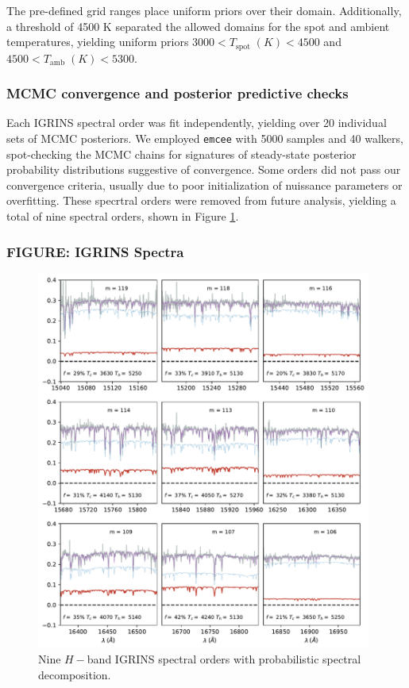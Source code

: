 \documentclass[twocolumn]{emulateapj}%
\begin{document}
\begin{itemize}
The pre-defined grid ranges place uniform priors over their domain.  Additionally, a threshold of 4500 K separated the allowed domains for the spot and ambient temperatures, yielding uniform priors $3000 < T_{\mathrm{spot}} \; (K) < 4500 $ and $4500 < T_{\mathrm{amb}} \; (K) < 5300$.

\subsubsection{MCMC convergence and posterior predictive checks}
Each IGRINS spectral order was fit independently, yielding over 20 individual sets of MCMC posteriors.  We employed \texttt{emcee} \citep{foreman13} with 5000 samples and 40 walkers, spot-checking the MCMC chains for signatures of steady-state posterior probability distributions suggestive of convergence.  Some orders did not pass our convergence criteria, usually due to poor initialization of nuissance parameters or overfitting.  These specrtral orders were removed from future analysis, yielding a total of nine spectral orders, shown in Figure \ref{fig:IGRINS_spectra3x3}.

\subsubsection{FIGURE: IGRINS Spectra}
\begin{figure}
 \centering
 \includegraphics[width=0.98\textwidth]{figures/H_band_spectra_3x3.pdf}
 \caption{Nine $H-$band IGRINS spectral orders with probabilistic spectral decomposition.}
 \label{fig:IGRINS_spectra3x3}
\end{figure}


\end{itemize}
\end{document}
